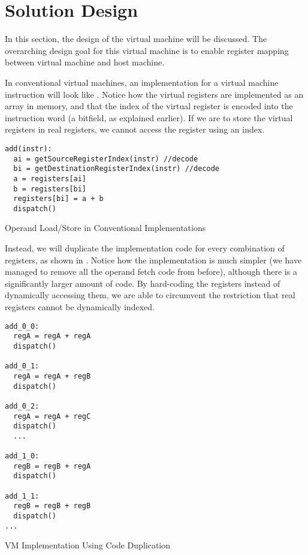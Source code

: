 \chapter{Solution Design}
	In this section, the design of the virtual machine will be discussed. The overarching design goal for this virtual machine is to enable register mapping between virtual machine and host machine.
	
	In conventional virtual machines, an implementation for a virtual machine instruction will look like . Notice how the virtual registers are implemented as an array in memory, and that the index of the virtual register is encoded into the instruction word (a bitfield, as explained earlier). If we are to store the virtual registers in real registers, we cannot access the register using an index.
	
	
	\begin{myfigure}
		\begin{lstlisting}
add(instr):
  ai = getSourceRegisterIndex(instr) //decode
  bi = getDestinationRegisterIndex(instr) //decode
  a = registers[ai]
  b = registers[bi]
  registers[bi] = a + b
  dispatch()
		\end{lstlisting}
		\caption{Operand Load/Store in Conventional Implementations}
		\label{fig:operandfetch}
	\end{myfigure}
	
	Instead, we will duplicate the implementation code for every combination of registers, as shown in . Notice how the implementation is much simpler (we have managed to remove all the operand fetch code from before), although there is a significantly larger amount of code. By hard-coding the registers instead of dynamically accessing them, we are able to circumvent the restriction that real registers cannot be dynamically indexed.
	
	\begin{myfigure}
		\begin{lstlisting}
add_0_0:
  regA = regA + regA
  dispatch()

add_0_1:
  regA = regA + regB
  dispatch()

add_0_2:
  regA = regA + regC
  dispatch()
  ...

add_1_0:
  regB = regB + regA
  dispatch()

add_1_1:
  regB = regB + regB
  dispatch()
...		
		\end{lstlisting}
		\caption{VM Implementation Using Code Duplication}
		\label{fig:dupimplementation}
	\end{myfigure}
	
